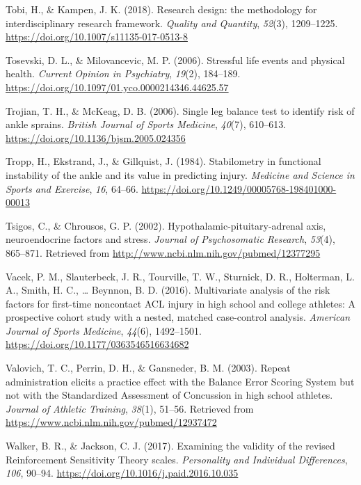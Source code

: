 \documentclass[man,floatsintext]{apa6}
\begin{document}
\leavevmode\hypertarget{ref-Tobi2018a}{}%
Tobi, H., \& Kampen, J. K. (2018). Research design: the methodology for interdisciplinary research framework. \emph{Quality and Quantity}, \emph{52}(3), 1209--1225. \url{https://doi.org/10.1007/s11135-017-0513-8}

\leavevmode\hypertarget{ref-Tosevski2006}{}%
Tosevski, D. L., \& Milovancevic, M. P. (2006). Stressful life events and physical health. \emph{Current Opinion in Psychiatry}, \emph{19}(2), 184--189. \url{https://doi.org/10.1097/01.yco.0000214346.44625.57}

\leavevmode\hypertarget{ref-Trojian2006}{}%
Trojian, T. H., \& McKeag, D. B. (2006). Single leg balance test to identify risk of ankle sprains. \emph{British Journal of Sports Medicine}, \emph{40}(7), 610--613. \url{https://doi.org/10.1136/bjsm.2005.024356}

\leavevmode\hypertarget{ref-Tropp1984}{}%
Tropp, H., Ekstrand, J., \& Gillquist, J. (1984). Stabilometry in functional instability of the ankle and its value in predicting injury. \emph{Medicine and Science in Sports and Exercise}, \emph{16}, 64--66. \url{https://doi.org/10.1249/00005768-198401000-00013}

\leavevmode\hypertarget{ref-Tsigos2002}{}%
Tsigos, C., \& Chrousos, G. P. (2002). Hypothalamic-pituitary-adrenal axis, neuroendocrine factors and stress. \emph{Journal of Psychosomatic Research}, \emph{53}(4), 865--871. Retrieved from \url{http://www.ncbi.nlm.nih.gov/pubmed/12377295}

\leavevmode\hypertarget{ref-Vacek2016}{}%
Vacek, P. M., Slauterbeck, J. R., Tourville, T. W., Sturnick, D. R., Holterman, L. A., Smith, H. C., \ldots{} Beynnon, B. D. (2016). Multivariate analysis of the risk factors for first-time noncontact ACL injury in high school and college athletes: A prospective cohort study with a nested, matched case-control analysis. \emph{American Journal of Sports Medicine}, \emph{44}(6), 1492--1501. \url{https://doi.org/10.1177/0363546516634682}

\leavevmode\hypertarget{ref-Valovich2003}{}%
Valovich, T. C., Perrin, D. H., \& Gansneder, B. M. (2003). Repeat administration elicits a practice effect with the Balance Error Scoring System but not with the Standardized Assessment of Concussion in high school athletes. \emph{Journal of Athletic Training}, \emph{38}(1), 51--56. Retrieved from \url{https://www.ncbi.nlm.nih.gov/pubmed/12937472}

\leavevmode\hypertarget{ref-Walker2017}{}%
Walker, B. R., \& Jackson, C. J. (2017). Examining the validity of the revised Reinforcement Sensitivity Theory scales. \emph{Personality and Individual Differences}, \emph{106}, 90--94. \url{https://doi.org/10.1016/j.paid.2016.10.035}
\end{document}
